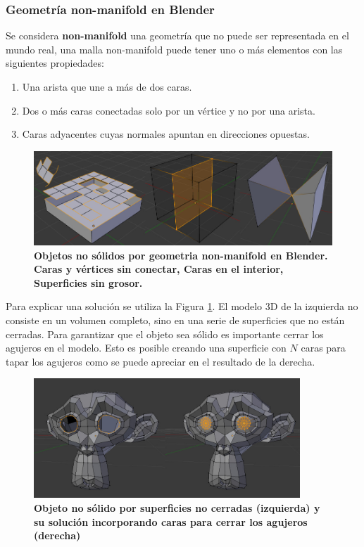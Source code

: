 \subsubsection{Geometría non-manifold en Blender}

Se considera \textbf{non-manifold} una geometría que no puede ser representada en el mundo real, una malla non-manifold puede tener uno o más elementos con las siguientes propiedades:

\begin{enumerate}
    \item Una arista que une a más de dos caras.
    \item Dos o más caras conectadas solo por un vértice y no por una arista.
    \item Caras adyacentes cuyas normales apuntan en direcciones opuestas.
\end{enumerate}

\begin{figure}[h]
\includegraphics[width=12cm]{Img/Modelos/modelado20.jpg}
\centering
\caption{\textbf{ \footnotesize{Objetos no sólidos por geometria non-manifold en Blender. Caras y vértices sin conectar, Caras en el interior, Superficies sin grosor.}}}
\end{figure}


Para explicar una solución se utiliza la Figura \ref{fig:blender}. El modelo 3D de la izquierda no consiste en un volumen completo, sino en una serie de superficies que no están cerradas. Para garantizar que el objeto sea sólido es importante cerrar los agujeros en el modelo. Esto es posible creando una superficie con $N$ caras para tapar los agujeros como se puede apreciar en el resultado de la derecha.

\begin{figure}[h]
\includegraphics[width=10cm]{Img/Modelos/modelado21.jpg}
\centering
\caption{\textbf{ \footnotesize{Objeto no sólido por superficies no cerradas (izquierda)  y su solución incorporando caras  para cerrar los agujeros (derecha) }}}
\label{fig:blender}
\end{figure}

